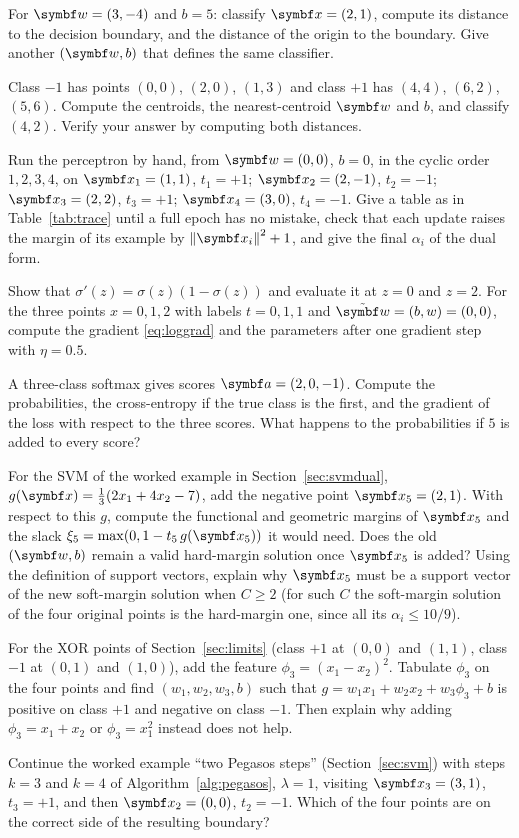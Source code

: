 \documentclass[11pt]{article}
\newcommand{\w}{\vect{w}}
\newcommand{\wt}{\tilde{\w}}
\begin{document}
\begin{questions}
\begin{calculations}
\item For $\w = (3, -4)$ and $b = 5$: classify $\x = (2, 1)$, compute its distance to the decision boundary, and the
distance of the origin to the boundary. Give another $(\w, b)$ that defines the same classifier.
\item Class $-1$ has points $(0, 0)$, $(2, 0)$, $(1, 3)$ and class $+1$ has $(4, 4)$, $(6, 2)$, $(5, 6)$. Compute the
centroids, the nearest-centroid $\w$ and $b$, and classify $(4, 2)$. Verify your answer by computing both distances.
\item Run the perceptron by hand, from $\w = (0, 0)$, $b = 0$, in the cyclic order $1, 2, 3, 4$, on $\x_1 = (1, 1)$,
$t_1 = +1$; $\x_2 = (2, -1)$, $t_2 = -1$; $\x_3 = (2, 2)$, $t_3 = +1$; $\x_4 = (3, 0)$, $t_4 = -1$. Give a table as in
Table~\ref{tab:trace} until a full epoch has no mistake, check that each update raises the margin of its example by
$\norm{\x_i}^2 + 1$, and give the final $\alpha_i$ of the dual form.
\item Show that $\sigma'(z) = \sigma(z)(1 - \sigma(z))$ and evaluate it at $z = 0$ and $z = 2$. For the three points
$x = 0, 1, 2$ with labels $t = 0, 1, 1$ and $\wt = (b, w) = (0, 0)$, compute the gradient \eqref{eq:loggrad} and the
parameters after one gradient step with $\eta = 0.5$.
\item A three-class softmax gives scores $\vect{a} = (2, 0, -1)$. Compute the probabilities, the cross-entropy if the true
class is the first, and the gradient of the loss with respect to the three scores. What happens to the probabilities if
$5$ is added to every score?
\item For the SVM of the worked example in Section~\ref{sec:svmdual}, $g(\x) = \frac13(2x_1 + 4x_2 - 7)$, add the
negative point $\x_5 = (2, 1)$. With respect to this $g$, compute the functional and geometric margins of $\x_5$ and the
slack $\xi_5 = \max(0, 1 - t_5\,g(\x_5))$ it would need. Does the old $(\w, b)$ remain a valid hard-margin solution once
$\x_5$ is added? Using the definition of support vectors, explain why $\x_5$ must be a support vector of the new
soft-margin solution when $C \ge 2$ (for such $C$ the soft-margin solution of the four original points is the hard-margin
one, since all its $\alpha_i \le 10/9$).
\item For the XOR points of Section~\ref{sec:limits} (class $+1$ at $(0, 0)$ and $(1, 1)$, class $-1$ at $(0, 1)$ and
$(1, 0)$), add the feature $\phi_3 = (x_1 - x_2)^2$. Tabulate $\phi_3$ on the four points and find $(w_1, w_2, w_3, b)$ such
that $g = w_1x_1 + w_2x_2 + w_3\phi_3 + b$ is positive on class $+1$ and negative on class $-1$. Then explain why adding $\phi_3 = x_1 + x_2$ or $\phi_3 = x_1^2$ instead does not help.
\item Continue the worked example ``two Pegasos steps'' (Section~\ref{sec:svm}) with steps $k = 3$ and $k = 4$ of
Algorithm~\ref{alg:pegasos}, $\lambda = 1$, visiting $\x_3 = (3, 1)$, $t_3 = +1$, and then $\x_2 = (0, 0)$, $t_2 = -1$.
Which of the four points are on the correct side of the resulting boundary?
\end{calculations}


\end{questions}
\end{document}
